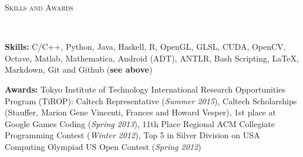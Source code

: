 \documentclass[9pt]{article}
\newenvironment{changemargin}[2]{%
  \begin{list}{}{%
    \setlength{\topsep}{0pt}%
    \setlength{\leftmargin}{#1}%
    \setlength{\rightmargin}{#2}%
    \setlength{\listparindent}{\parindent}%
    \setlength{\itemindent}{\parindent}%
    \setlength{\parsep}{\parskip}%
  }%
  \item[]}{\end{list}
}
\newcommand{\lineover}{
	\begin{changemargin}{-0.05in}{-0.05in}
		\vspace*{-8pt}
		\hrulefill \\
		\vspace*{-2pt}
	\end{changemargin}
}
\newcommand{\header}[1]{
	\begin{changemargin}{-0.5in}{-0.5in}
		\scshape{#1}\\
  	\lineover
	\end{changemargin}
}
\newenvironment{body} {
	\vspace*{-16pt}
	\begin{changemargin}{-0.25in}{-0.5in}
  }	
	{\end{changemargin}
}
\begin{document}
\smallskip

\header{Skills and Awards}
\smallskip
\begin{body}
	\vspace{14pt}
	
		\textbf{Skills:} C/C++, Python, Java, Haskell, R, OpenGL, GLSL, CUDA, OpenCV, Octave, Matlab, Mathematica, Android (ADT), ANTLR, Bash Scripting, \LaTeX, Markdown, Git and Github (\textbf{see above})\\
	
	\medskip
	
	\textbf{Awards:} Tokyo Institute of Technology International Research Opportunities Program (TiROP): Caltech Representative (\emph{Summer 2015}), Caltech Scholarships (Stauffer, Marion Gene Vincenti, Frances and Howard Vesper),
        1st place at Google Games Coding (\emph{Spring 2013}),
        11th Place Regional ACM Collegiate Programming Contest (\emph{Winter 2012}),
        Top 5 in Silver Division on USA Computing Olympiad US Open Contest (\emph{Spring 2012})
	
	
%
\end{body}
\end{document}
